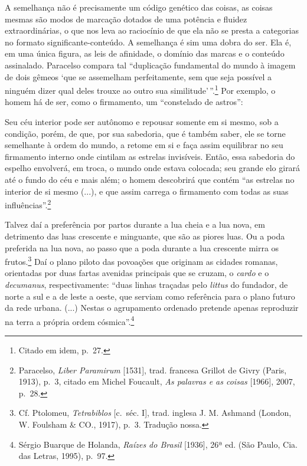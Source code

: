 A semelhança não é precisamente um código genético das coisas, as coisas
mesmas são modos de marcação dotados de uma potência e fluidez
extraordinárias, o que nos leva ao raciocínio de que ela não se presta a
categorias no formato significante-conteúdo. A semelhança é sim uma
dobra do ser. Ela é, em uma única figura, as leis de afinidade, o
domínio das marcas e o conteúdo assinalado. Paracelso compara tal
``duplicação fundamental do mundo à imagem de dois gêmeos `que se
assemelham perfeitamente, sem que seja possível a ninguém dizer qual
deles trouxe ao outro sua similitude'\,''.\footnote{Citado em idem,
  p.~27.} Por exemplo, o homem há de ser, como o firmamento, um
``constelado de astros'':

Seu céu interior pode ser autônomo e repousar somente em si mesmo, sob a
condição, porém, de que, por sua sabedoria, que é também saber, ele se
torne semelhante à ordem do mundo, a retome em si e faça assim
equilibrar no seu firmamento interno onde cintilam as estrelas
invisíveis. Então, essa sabedoria do espelho envolverá, em troca, o
mundo onde estava colocada; seu grande elo girará até o fundo do céu e
mais além; o homem descobrirá que contém ``as estrelas no interior de si
mesmo (...), e que assim carrega o firmamento com todas as suas
influências''.\footnote{Paracelso, \emph{Liber Paramirum} {[}1531{]},
  trad. francesa Grillot de Givry (Paris, 1913), p.~3, citado em Michel
  Foucault, \emph{As palavras e as coisas} {[}1966{]}, 2007, p.~28.}

Talvez daí a preferência por partos durante a lua cheia e a lua nova, em
detrimento das luas crescente e minguante, que são as piores luas. Ou a
poda preferida na lua nova, ao passo que a poda durante a lua crescente
mirra os frutos.\footnote{Cf. Ptolomeu, \emph{Tetrabiblos} {[}c.~séc.
  I{]}, trad. inglesa J. M. Ashmand (London, W. Foulsham \& CO., 1917),
  p.~3. Tradução nossa.} Daí o plano piloto das povoações que originam
as cidades romanas, orientadas por duas fartas avenidas principais que
se cruzam, o \emph{cardo} e o \emph{decumanus}, respectivamente: ``duas
linhas traçadas pelo \emph{littus} do fundador, de norte a sul e a de
leste a oeste, que serviam como referência para o plano futuro da rede
urbana. (...) Nestas o agrupamento ordenado pretende apenas reproduzir
na terra a própria ordem cósmica''.\footnote{Sérgio Buarque de Holanda,
  \emph{Raízes do Brasil} {[}1936{]}, 26ª ed. (São Paulo, Cia. das
  Letras, 1995), p.~97.}

